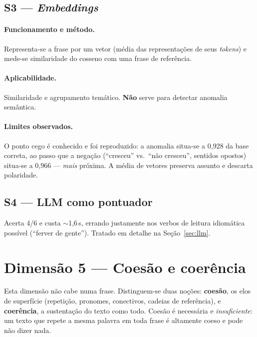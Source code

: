 \documentclass[11pt,a4paper]{article}
\begin{document}
\subsection{S3 --- \textit{Embeddings}}

\paragraph{Funcionamento e método.} Representa-se a frase por um vetor (média das representações de
seus \textit{tokens}) e mede-se similaridade do cosseno com uma frase de referência.

\paragraph{Aplicabilidade.} Similaridade e agrupamento temático. \textbf{Não} serve para detectar
anomalia semântica.

\paragraph{Limites observados.} O ponto cego é conhecido e foi reproduzido: a anomalia situa-se a
0,928 da base correta, ao passo que a negação (``cresceu'' vs.\ ``não cresceu'', sentidos opostos)
situa-se a 0,966 --- \emph{mais} próxima. A média de vetores preserva assunto e descarta polaridade.

\subsection{S4 --- LLM como pontuador}

Acerta 4/6 e custa $\sim$1,6\,s, errando justamente nos verbos de leitura idiomática possível
(``ferver de gente''). Tratado em detalhe na Seção~\ref{sec:llm}.

\section{Dimensão 5 --- Coesão e coerência}

Esta dimensão não cabe numa frase. Distinguem-se duas noções: \textbf{coesão}, os elos de superfície
(repetição, pronomes, conectivos, cadeias de referência), e \textbf{coerência}, a sustentação do
texto como todo. Coesão é necessária e \emph{insuficiente}: um texto que repete a mesma palavra em
toda frase é altamente coeso e pode não dizer nada.
\end{document}
